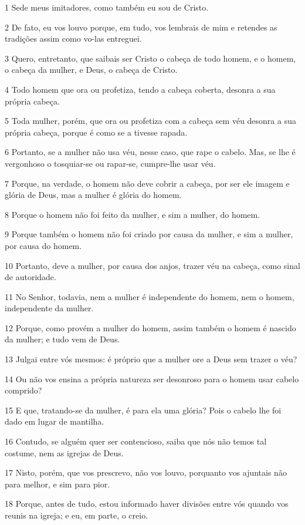 \par 1 Sede meus imitadores, como também eu sou de Cristo.
\par 2 De fato, eu vos louvo porque, em tudo, vos lembrais de mim e retendes as tradições assim como vo-las entreguei.
\par 3 Quero, entretanto, que saibais ser Cristo o cabeça de todo homem, e o homem, o cabeça da mulher, e Deus, o cabeça de Cristo.
\par 4 Todo homem que ora ou profetiza, tendo a cabeça coberta, desonra a sua própria cabeça.
\par 5 Toda mulher, porém, que ora ou profetiza com a cabeça sem véu desonra a sua própria cabeça, porque é como se a tivesse rapada.
\par 6 Portanto, se a mulher não usa véu, nesse caso, que rape o cabelo. Mas, se lhe é vergonhoso o tosquiar-se ou rapar-se, cumpre-lhe usar véu.
\par 7 Porque, na verdade, o homem não deve cobrir a cabeça, por ser ele imagem e glória de Deus, mas a mulher é glória do homem.
\par 8 Porque o homem não foi feito da mulher, e sim a mulher, do homem.
\par 9 Porque também o homem não foi criado por causa da mulher, e sim a mulher, por causa do homem.
\par 10 Portanto, deve a mulher, por causa dos anjos, trazer véu na cabeça, como sinal de autoridade.
\par 11 No Senhor, todavia, nem a mulher é independente do homem, nem o homem, independente da mulher.
\par 12 Porque, como provém a mulher do homem, assim também o homem é nascido da mulher; e tudo vem de Deus.
\par 13 Julgai entre vós mesmos: é próprio que a mulher ore a Deus sem trazer o véu?
\par 14 Ou não vos ensina a própria natureza ser desonroso para o homem usar cabelo comprido?
\par 15 E que, tratando-se da mulher, é para ela uma glória? Pois o cabelo lhe foi dado em lugar de mantilha.
\par 16 Contudo, se alguém quer ser contencioso, saiba que nós não temos tal costume, nem as igrejas de Deus.
\par 17 Nisto, porém, que vos prescrevo, não vos louvo, porquanto vos ajuntais não para melhor, e sim para pior.
\par 18 Porque, antes de tudo, estou informado haver divisões entre vós quando vos reunis na igreja; e eu, em parte, o creio.
